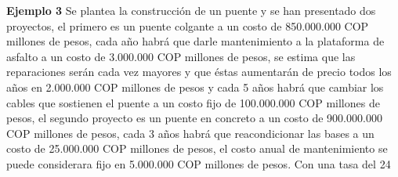 \textbf{Ejemplo 3}\newline
Se plantea la construcción de un puente y se han presentado dos proyectos, el primero es un puente colgante a un costo de 850.000.000 COP millones de pesos, cada año habrá que darle mantenimiento a la plataforma de asfalto a un costo de 3.000.000 COP millones de pesos, se estima que las reparaciones serán cada vez mayores y que éstas aumentarán de precio todos los años en 2.000.000 COP millones de pesos y cada 5 años habrá que cambiar los cables que sostienen el puente a un costo fijo de 100.000.000 COP millones de pesos, el segundo proyecto es un puente en concreto a un costo de 900.000.000 COP millones de pesos, cada 3 años habrá que reacondicionar las bases a un costo de 25.000.000 COP millones de pesos, el costo anual de mantenimiento se puede considerara fijo en 5.000.000 COP millones de pesos. Con una tasa del 24%

